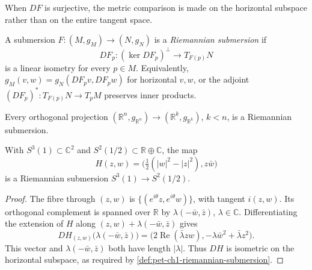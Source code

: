When $DF$ is surjective, the metric comparison is made on the horizontal
subspace rather than on the entire tangent space.

\begin{definition}
  \label{def:pet-ch1-riemannian-submersion}


  A submersion $F:(M,g_M)\to(N,g_N)$ is a \emph{Riemannian submersion} if
  \[
    DF_p:(\ker DF_p)^\perp\longrightarrow T_{F(p)}N
  \]
  is a linear isometry for every $p\in M$. Equivalently,
  $g_M(v,w)=g_N(DF_pv,DF_pw)$ for horizontal $v,w$, or the adjoint
  $(DF_p)^*:T_{F(p)}N\to T_pM$ preserves inner products.
\end{definition}

\begin{example}
  \label{ex:pet-ch1-orthogonal-projection}


  Every orthogonal projection
  $(\mathbb{R}^n,g_{\mathbb{R}^n})\to(\mathbb{R}^k,g_{\mathbb{R}^k})$, $k<n$,
  is a Riemannian submersion.
\end{example}

\begin{example}
  \label{ex:pet-ch1-hopf-fibration}


  With $S^3(1)\subset\mathbb{C}^2$ and
  $S^2(1/2)\subset\mathbb{R}\oplus\mathbb{C}$, the map
  \[
    H(z,w)=\Big(\tfrac12(|w|^2-|z|^2),z\bar w\Big)
  \]
  is a Riemannian submersion $S^3(1)\to S^2(1/2)$.
\end{example}
\begin{proof}

  \sketch
  The fibre through $(z,w)$ is
  $\{(e^{i\theta}z,e^{i\theta}w)\}$, with tangent $i(z,w)$. Its orthogonal
  complement is spanned over $\mathbb{R}$ by
  $\lambda(-\bar w,\bar z)$, $\lambda\in\mathbb{C}$. Differentiating the
  extension of $H$ along
  $(z,w)+\lambda(-\bar w,\bar z)$ gives
  \[
    DH_{(z,w)}\big(\lambda(-\bar w,\bar z)\big)
      =\big(2\operatorname{Re}(\bar\lambda zw),
             -\lambda\bar w^2+\bar\lambda z^2\big).
  \]
  This vector and $\lambda(-\bar w,\bar z)$ both have length $|\lambda|$.
  Thus $DH$ is isometric on the horizontal subspace, as required by
  \cref{def:pet-ch1-riemannian-submersion}.
\end{proof}


